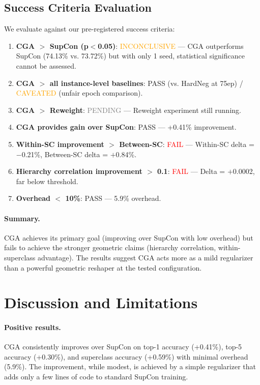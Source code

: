 \documentclass{article}
\begin{document}
\subsection{Success Criteria Evaluation}

We evaluate against our pre-registered success criteria:
\begin{enumerate}
    \item \textbf{CGA $>$ SupCon (p$<$0.05)}: \textcolor{orange}{INCONCLUSIVE} --- CGA outperforms SupCon (74.13\% vs. 73.72\%) but with only 1 seed, statistical significance cannot be assessed.
    \item \textbf{CGA $>$ all instance-level baselines}: \textcolor{green!60!black}{PASS} (vs. HardNeg at 75ep) / \textcolor{orange}{CAVEATED} (unfair epoch comparison).
    \item \textbf{CGA $>$ Reweight}: \textcolor{gray}{PENDING} --- Reweight experiment still running.
    \item \textbf{CGA provides gain over SupCon}: \textcolor{green!60!black}{PASS} --- +0.41\% improvement.
    \item \textbf{Within-SC improvement $>$ Between-SC}: \textcolor{red}{FAIL} --- Within-SC delta = $-$0.21\%, Between-SC delta = $+$0.84\%.
    \item \textbf{Hierarchy correlation improvement $>$ 0.1}: \textcolor{red}{FAIL} --- Delta = $+$0.0002, far below threshold.
    \item \textbf{Overhead $<$ 10\%}: \textcolor{green!60!black}{PASS} --- 5.9\% overhead.
\end{enumerate}

\paragraph{Summary.} CGA achieves its primary goal (improving over SupCon with low overhead) but fails to achieve the stronger geometric claims (hierarchy correlation, within-superclass advantage). The results suggest CGA acts more as a mild regularizer than a powerful geometric reshaper at the tested configuration.

\section{Discussion and Limitations}
\label{sec:discussion}

\paragraph{Positive results.} CGA consistently improves over SupCon on top-1 accuracy (+0.41\%), top-5 accuracy (+0.30\%), and superclass accuracy (+0.59\%) with minimal overhead (5.9\%). The improvement, while modest, is achieved by a simple regularizer that adds only a few lines of code to standard SupCon training.
\end{document}
